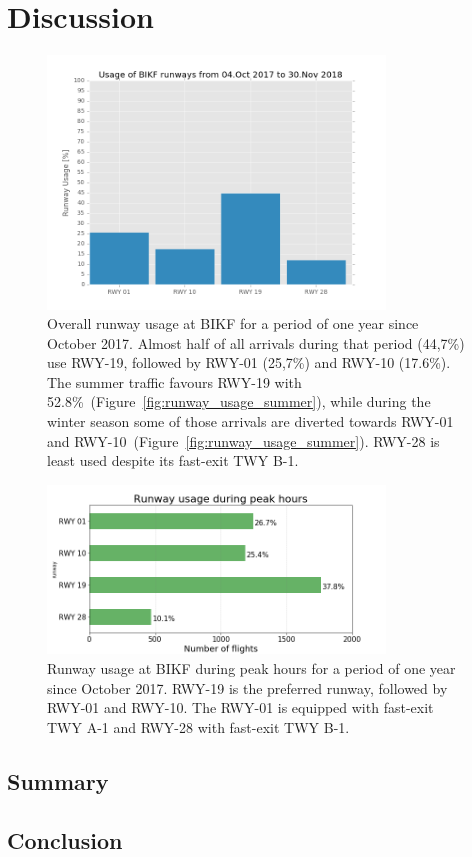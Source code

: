 \chapter{Discussion}





\begin{figure}[]
    \centering
    \includegraphics[width=0.8\textwidth]{graphics/fig_runway_usage_2017-10-04_to_2018-11-30.png}
    \caption[Runway usage at BIKF]{Overall runway usage at BIKF for a period of one year since October 2017. Almost half of all arrivals during that period (44,7\%) use RWY-19, followed by RWY-01 (25,7\%) and RWY-10 (17.6\%). The summer traffic favours RWY-19 with 52.8\%~(Figure~\ref{fig:runway_usage_summer}), while during the winter season some of those arrivals are diverted towards RWY-01 and RWY-10~(Figure~\ref{fig:runway_usage_summer}). RWY-28 is least used despite its fast-exit TWY B-1.}
    \label{fig:runway_usage}
\end{figure}


\begin{figure}[]
    \centering
    \includegraphics[width=0.8\textwidth]{graphics/fig_runway_usage_peak.png}
    \caption[Runway usage at BIKF during peak hours]{Runway usage at BIKF during peak hours for a period of one year since October 2017. RWY-19 is the preferred runway, followed by RWY-01 and RWY-10. The RWY-01 is equipped with fast-exit TWY A-1 and RWY-28 with fast-exit TWY B-1.}
    \label{fig:runway_usage_peak}
\end{figure}




\section{Summary}

\section{Conclusion\label{sec:conclusions}}
